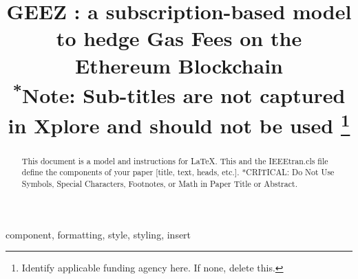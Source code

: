 
    


\title{GEEZ : a subscription-based model to hedge Gas Fees on the Ethereum Blockchain\\
{\footnotesize \textsuperscript{*}Note: Sub-titles are not captured in Xplore and
should not be used}
\thanks{Identify applicable funding agency here. If none, delete this.}
}

\author{
\and
{}
\and
{}
\and
{}

}

\maketitle

\begin{abstract}
This document is a model and instructions for \LaTeX.
This and the IEEEtran.cls file define the components of your paper [title, text, heads, etc.]. *CRITICAL: Do Not Use Symbols, Special Characters, Footnotes, 
or Math in Paper Title or Abstract.
\end{abstract}

\begin{IEEEkeywords}
component, formatting, style, styling, insert
\end{IEEEkeywords}